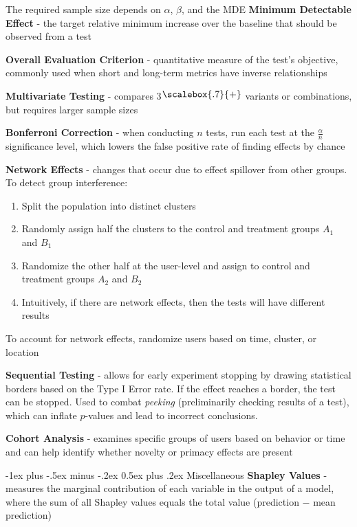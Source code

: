 \documentclass[10pt,landscape]{article}
\makeatletter
\newcommand{\plus}{\raisebox{.3\height}{\scalebox{.7}{+}}}
\renewcommand{\section}{\@startsection{section}{1}{0mm}%
                                {-1ex plus -.5ex minus -.2ex}%
                                {0.5ex plus .2ex}%
                                {\normalfont\large\bfseries}}
\makeatother
\begin{document}
\begin{multicols}{3}
The required sample size depends on $\alpha$, $\beta$, and the MDE
\textbf{Minimum Detectable Effect} - the target relative minimum increase over the baseline that should be observed from a test
\vspace{.5mm}

\textbf{Overall Evaluation Criterion} - quantitative measure of the test's objective, commonly used when short and long-term metrics have inverse relationships
\vspace{.7mm}

\textbf{Multivariate Testing} - compares 3$\plus$ variants or combinations, but requires larger sample sizes

\textbf{Bonferroni Correction} - when conducting $n$ tests,
run each test at the $\frac{\alpha}{n}$ significance level, which lowers the false positive rate of finding effects by chance
\vspace{.7mm}

\textbf{Network Effects} - changes that occur due to effect spillover from other groups. To detect group interference:
\begin{enumerate}[leftmargin=5mm]
    \itemsep -.4mm
    \item Split the population into distinct clusters
    \item Randomly assign half the clusters to the control and treatment groups $A_1$ and $B_1$
    \item Randomize the other half at the user-level and assign to control and treatment groups
    $A_2$ and $B_2$
    \item Intuitively, if there are network effects, then the tests will have different results
\end{enumerate}
To account for network effects, randomize users based on time, cluster, or location
\smallskip

\textbf{Sequential Testing} - allows for early experiment stopping by drawing statistical borders based on the Type I Error rate. If the effect reaches a border, the test can be stopped. Used to combat \emph{peeking} (preliminarily checking results of a test), which can inflate $p$-values and lead to incorrect conclusions.

\textbf{Cohort Analysis} - examines specific groups of users based on behavior or time and can help identify whether novelty or primacy effects are present

\section{Miscellaneous}
\textbf{Shapley Values} - measures the marginal contribution of each variable in the output of a model, where the sum of all Shapley values equals the total value (prediction $-$ mean prediction)


\end{multicols}
\end{document}
